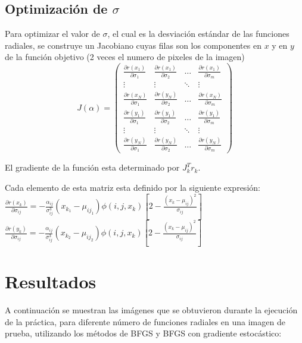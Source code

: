 \documentclass[10pt,journal,compsoc]{styles/IEEEtran}
\begin{document}
\subsection{Optimización de $\sigma$}

Para optimizar el valor de $\sigma$, el cual es la desviación estándar de las funciones radiales, se construye un Jacobiano cuyas filas son los componentes en $x$ y en $y$ de la función objetivo (2 veces el numero de pixeles de la imagen)\\

\[J(\alpha)= \left( \begin{array}{cccc}
\frac{\partial r(x_1)}{\partial \sigma_1} & \frac{\partial r(x_1)}{\partial \sigma_2} & \ldots & \frac{\partial r(x_1)}{\partial \sigma_m} \\
\vdots & \vdots & \ddots & \vdots \\
\frac{\partial r(x_N)}{\partial \sigma_1} & \frac{\partial r(y_N)}{\partial \sigma_2} & \ldots & \frac{\partial r(x_N)}{\partial \sigma_m} \\
\frac{\partial r(y_1)}{\partial \sigma_1} & \frac{\partial r(y_1)}{\partial \sigma_2} & \ldots & \frac{\partial r(y_1)}{\partial \sigma_m} \\
\vdots & \vdots & \ddots & \vdots \\
\frac{\partial r(y_N)}{\partial \sigma_1} & \frac{\partial r(y_N)}{\partial \sigma_2} & \ldots & \frac{\partial r(y_N)}{\partial \sigma_m} 
\end{array} \right)\] 

El gradiente de la función esta determinado por $J_k^Tr_k$. 

Cada elemento de esta matriz esta definido por la siguiente expresión:\\

$\frac{\partial r(x_k)}{\partial \sigma_{ij}}=-\frac{\alpha_{ij}}{\sigma_{ij}^3}(x_{k_1}-\mu_{ij_1})\phi(i,j,x_k)[2-\frac{(x_k-\mu_{ij})^2}{\sigma_{ij}}]$\\

$\frac{\partial r(y_k)}{\partial \sigma_{ij}}=-\frac{\alpha_{ij}}{\sigma_{ij}^3}(x_{k_2}-\mu_{ij_2})\phi(i,j,x_k)[2-\frac{(x_k-\mu_{ij})^2}{\sigma_{ij}}]$\\

\section{Resultados}

A continuación se muestran las imágenes que se obtuvieron durante la ejecución de la práctica, para diferente n\'umero de funciones radiales en una imagen de prueba, utilizando los métodos de BFGS y BFGS con gradiente estocástico:\\
\end{document}
